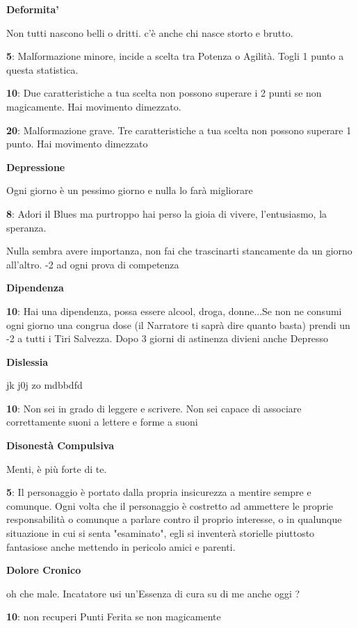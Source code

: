 \documentclass[a4paper,11pt,twoside,openany]{book}
\begin{document}
\textbf{Deformita'}

Non tutti nascono belli o dritti. c'è anche chi nasce storto e brutto.

\textbf{5}: Malformazione minore, incide a scelta tra Potenza o Agilità. Togli 1 punto a questa statistica.

\textbf{10}: Due caratteristiche a tua scelta non possono superare i 2 punti se non magicamente. Hai movimento dimezzato.

\textbf{20}: Malformazione grave. Tre caratteristiche a tua scelta non possono superare 1 punto. Hai movimento dimezzato

\textbf{Depressione}

Ogni giorno è un pessimo giorno e nulla lo farà migliorare

\textbf{8}: Adori il Blues ma purtroppo hai perso la gioia di vivere, l'entusiasmo, la speranza.

Nulla sembra avere importanza, non fai che trascinarti stancamente da un giorno all'altro. -2 ad ogni prova di competenza

\textbf{Dipendenza}

\textbf{10}: Hai una dipendenza, possa essere alcool, droga, donne...Se non ne consumi ogni giorno una congrua dose (il Narratore ti saprà dire quanto basta) prendi un -2 a tutti i Tiri Salvezza. Dopo 3 giorni di astinenza divieni anche Depresso

\textbf{Dislessia}

jk j0j zo mdbbdfd

\textbf{10}: Non sei in grado di leggere e scrivere. Non sei capace di associare correttamente suoni a lettere e forme a suoni

\textbf{Disonestà Compulsiva}

Menti, è più forte di te.

\textbf{5}: Il personaggio è portato dalla propria insicurezza a mentire sempre e comunque. Ogni volta che il personaggio è costretto ad ammettere le proprie responsabilità o comunque a parlare contro il proprio interesse, o in qualunque situazione in cui si senta "esaminato", egli si inventerà storielle piuttosto fantasiose anche mettendo in pericolo amici e parenti.

\textbf{Dolore Cronico}

oh che male. Incatatore usi un'Essenza di cura su di me anche oggi ?

\textbf{10}: non recuperi Punti Ferita se non magicamente
\end{document}

